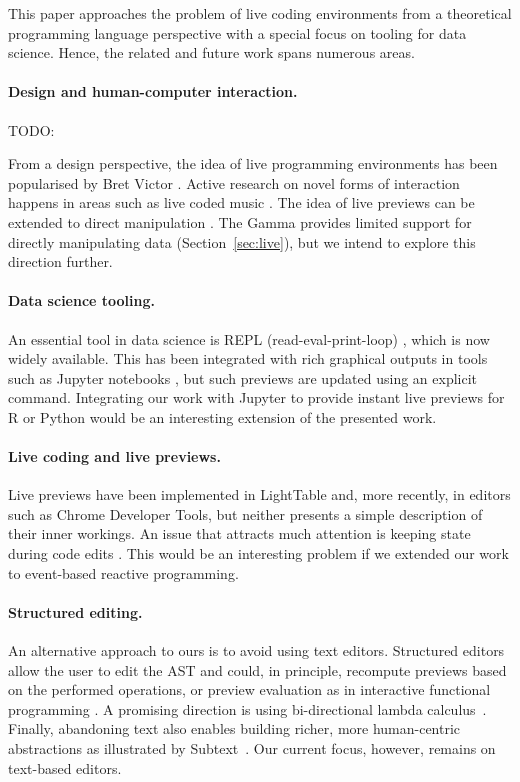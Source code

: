 \documentclass[acmsmall,anonymous,fleqn]{acmart}\settopmatter{printfolios=false,printccs=false,printacmref=false}
\theoremstyle{plain}
\theoremstyle{definition}
\begin{document}
This paper approaches the problem of live coding environments from a theoretical programming
language perspective with a special focus on tooling for data science. Hence, the related and
future work spans numerous areas.

\paragraph{Design and human-computer interaction.}
TODO: \citet{principle}

From a design perspective, the idea of live programming environments has been popularised by
Bret Victor \cite{learnable}. Active research on novel forms of interaction happens in areas
such as live coded music \cite{beyond,sonic}.
The idea of live previews can be extended to direct manipulation \cite{direct}. The Gamma
provides limited support for directly manipulating data (Section~\ref{sec:live}), but we
intend to explore this direction further.

\paragraph{Data science tooling.}
An essential tool in data science is REPL (read-eval-print-loop) \cite{drscheme}, which is now
widely available. This has been integrated with rich graphical outputs in tools such as Jupyter
notebooks \cite{jupyter,ipython}, but such previews are updated using an explicit command.
Integrating our work with Jupyter to provide instant live previews for R or Python would be
an interesting extension of the presented work.

\paragraph{Live coding and live previews.}
Live previews have been implemented in LightTable \cite{lighttable} and, more recently, in
editors such as Chrome Developer Tools, but neither presents a simple description of their
inner workings. An issue that attracts much attention is keeping state during code edits
\cite{alive,livingit}. This would be an interesting problem if we extended our work to
event-based reactive programming.

\paragraph{Structured editing.}
An alternative approach to ours is to avoid using text editors. Structured editors
\cite{structure-based} allow the user to edit the AST and could, in principle, recompute previews
based on the performed operations, or preview evaluation as in interactive functional programming
\cite{interactive}. A promising direction is using bi-directional lambda calculus~\cite{hazelnut}.
Finally, abandoning text also enables building richer, more human-centric
abstractions as illustrated by Subtext~\cite{subtext}. Our current focus, however, remains
on text-based editors.
\end{document}

